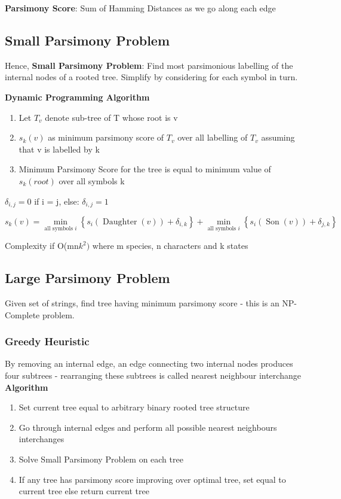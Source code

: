 \documentclass{article}
\begin{document}
\textbf{Parsimony Score}: Sum of Hamming Distances as we go along each edge

\subsection{Small Parsimony Problem}
Hence, \textbf{Small Parsimony Problem}: Find most parsimonious labelling of the internal nodes of a rooted tree. Simplify by considering for each symbol in turn.

\textbf{Dynamic Programming Algorithm}
\begin{enumerate}
    \item Let $T_{v}$ denote sub-tree of T whose root is v
    \item $s_{k}(v)$ as minimum parsimony score of $T_{v}$ over all labelling of $T_{v}$ assuming that v is labelled by k
    \item Minimum Parsimony Score for the tree is equal to minimum value of $s_{k}(root)$ over all symbols k
\end{enumerate}

$\delta_{i, j} = 0$ if i = j, else: $\delta_{i, j} = 1$

$$
s_{k}(v)=\min _{\text {all symbols } i}\left\{s_{i}(\operatorname{Daughter}(v))+\delta_{i, k}\right\}+\min _{\text {all symbols } i}\left\{s_{i}(\operatorname{Son}(v))+\delta_{j, k}\right\}
$$

Complexity if O(mn$k^{2})$ where m species, n characters and k states

\subsection{Large Parsimony Problem}
Given set of strings, find tree having minimum parsimony score - this is an NP-Complete problem.

\subsubsection{Greedy Heuristic}
By removing an internal edge, an edge connecting two internal nodes produces four subtrees - rearranging these subtrees is called nearest neighbour interchange\\

\noindent
\textbf{Algorithm}
\begin{enumerate}
    \item Set current tree equal to arbitrary binary rooted tree structure
    \item Go through internal edges and perform all possible nearest neighbours interchanges
    \item Solve Small Parsimony Problem on each tree
    \item If any tree has parsimony score improving over optimal tree, set equal to current tree else return current tree
\end{enumerate}
\end{document}
